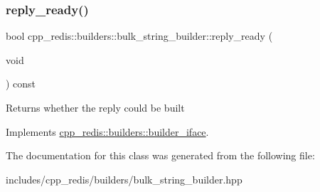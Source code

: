 \subsubsection{\texorpdfstring{reply\+\_\+ready()}{reply\_ready()}}
{\footnotesize\ttfamily bool cpp\+\_\+redis\+::builders\+::bulk\+\_\+string\+\_\+builder\+::reply\+\_\+ready (\begin{DoxyParamCaption}\item[{void}]{ }\end{DoxyParamCaption}) const\hspace{0.3cm}{\ttfamily [virtual]}}

\begin{DoxyReturn}{Returns}
whether the reply could be built 
\end{DoxyReturn}


Implements \hyperlink{classcpp__redis_1_1builders_1_1builder__iface_a40db9a31d4ea1771777e74146d31e12d}{cpp\+\_\+redis\+::builders\+::builder\+\_\+iface}.



The documentation for this class was generated from the following file\+:\begin{DoxyCompactItemize}
\item 
includes/cpp\+\_\+redis/builders/bulk\+\_\+string\+\_\+builder.\+hpp\end{DoxyCompactItemize}
